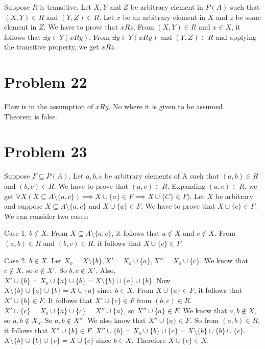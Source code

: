 \documentclass{article}
\begin{document}
Suppose $R$ is transitive. Let $X,Y$ and $Z$ be arbitrary element in
$P(A)$ such that $(X,Y) \in R$ and $(Y,Z) \in R$. Let $x$ be an
arbitrary element in $X$ and $z$ be some element in $Z$. We have to
prove that $xRz$. From $(X,Y) \in R$ and $x \in X$, it follows that
$\exists y \in Y (xRy)$. From $\exists y \in Y (xRy)$ and
$(Y,Z) \in R$ and applying the transitive property, we get $xRz$.

\section{Problem 22}

Flaw is in the assumption of $xRy$. No where it is given to be
assumed. \\

Theorem is false.

\section{Problem 23}
Suppose $F \subseteq P(A)$. Let $a,b,c$ be arbitrary elements of A
such that $(a,b) \in R$ and $(b,c) \in R$. We have to prove that
$(a,c) \in R$. Expanding $(a,c) \in R$, we get $\forall X(X \subseteq
A \setminus \{a,c\}) \implies X \cup \{a\} \in F \implies X \cup \{C\}
\in F)$. Let $X$ be arbitrary and suppose $X \subseteq A \setminus
\{a,c\}$ and $X \cup \{a\} \in F$. We have to prove that $X \cup \{c\}
\in F$. We can consider two cases:

Case 1. $b \notin X$. From $X \subseteq A \setminus \{a,c\}$, it
follows that $a \notin X$ and $c \notin X$. From $(a,b) \in R$ and
$(b,c) \in R$, it follows that $X \cup \{c\} \in F$.

Case 2. $b \in X$. Let $X_o = X \setminus \{b\}, X' = X_o \cup \{a\},
X'' = X_o \cup \{c\}$. We know that $c \notin X$, so $c \notin X'$. So
$b,c \notin X'$. Also, $X' \cup \{b\} = X_o \cup \{a\} \cup \{b\} = X
\setminus \{b\} \cup \{a\} \cup \{b\}$. Now $X \setminus \{b\} \cup
\{a\} \cup \{b\} = X \cup \{a\} $ since $b \in X$. From $X \cup \{a\}
\in F$, it follows that $X' \cup \{b\} \in F$. It follows that $X'
\cup \{c\} \in F$ from $(b,c) \in R$. $X' \cup \{c\} = X_o \cup \{a\}
\cup \{c\} = X'' \cup \{a\}$, so $X'' \cup \{a\} \in F$. We know that
$a,b \notin X$, so $a,b \notin X_o$. So $a,b \notin X''$. We also know
that $X'' \cup \{a\} \in F$. So from $(a,b) \in R$, it follows that
$X'' \cup \{b\} \in F$. $X'' \cup \{b\} = X_o \cup \{b\} \cup \{c\} =
X \setminus \{b\} \cup \{b\} \cup \{c\}$. $X \setminus \{b\} \cup
\{b\} \cup \{c\} = X \cup \{c\}$ since $b \in X$. Therefore $X \cup
\{c\} \in X$.
\end{document}
